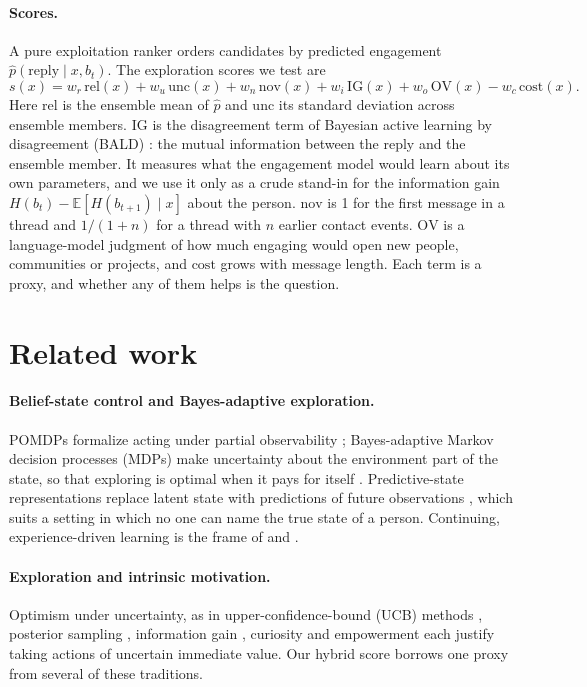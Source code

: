 \documentclass[11pt]{article}
\begin{document}
\paragraph{Scores.} A pure exploitation ranker orders candidates by predicted engagement $\hat{p}(\text{reply} \mid x, b_t)$. The exploration scores we test are
\begin{equation}
s(x) = w_r\,\mathrm{rel}(x) + w_u\,\mathrm{unc}(x) + w_n\,\mathrm{nov}(x) + w_i\,\mathrm{IG}(x) + w_o\,\mathrm{OV}(x) - w_c\,\mathrm{cost}(x).
\label{eq:hybrid}
\end{equation}
Here $\mathrm{rel}$ is the ensemble mean of $\hat{p}$ and $\mathrm{unc}$ its standard deviation across ensemble members. $\mathrm{IG}$ is the disagreement term of Bayesian active learning by disagreement (BALD) \citep{houlsby2011bayesian}: the mutual information between the reply and the ensemble member. It measures what the engagement model would learn about its own parameters, and we use it only as a crude stand-in for the information gain $H(b_t) - \mathbb{E}[H(b_{t+1}) \mid x]$ about the person. $\mathrm{nov}$ is 1 for the first message in a thread and $1/(1+n)$ for a thread with $n$ earlier contact events. $\mathrm{OV}$ is a language-model judgment of how much engaging would open new people, communities or projects, and $\mathrm{cost}$ grows with message length. Each term is a proxy, and whether any of them helps is the question.

\section{Related work}

\paragraph{Belief-state control and Bayes-adaptive exploration.} POMDPs formalize acting under partial observability \citep{kaelbling1998planning}; Bayes-adaptive Markov decision processes (MDPs) make uncertainty about the environment part of the state, so that exploring is optimal when it pays for itself \citep{duff2002optimal,guez2012efficient}. Predictive-state representations replace latent state with predictions of future observations \citep{littman2002predictive,singh2004predictive}, which suits a setting in which no one can name the true state of a person. Continuing, experience-driven learning is the frame of \citet{sutton2018reinforcement} and \citet{silver2025era}.

\paragraph{Exploration and intrinsic motivation.} Optimism under uncertainty, as in upper-confidence-bound (UCB) methods \citep{auer2002finite}, posterior sampling \citep{thompson1933likelihood,russo2018tutorial}, information gain \citep{houlsby2011bayesian}, curiosity \citep{schmidhuber2010formal,pathak2017curiosity} and empowerment \citep{klyubin2005empowerment} each justify taking actions of uncertain immediate value. Our hybrid score borrows one proxy from several of these traditions.
\end{document}
